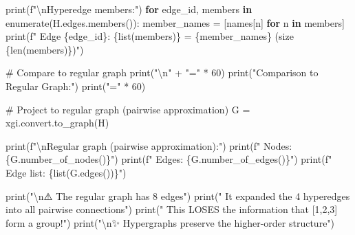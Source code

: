 \documentclass[
  11pt,
  letterpaper,
  oneside,
  openany]{book}
\newenvironment{Shaded}{\begin{snugshade}}{\end{snugshade}}
\newcommand{\BuiltInTok}[1]{\textcolor[rgb]{0.00,0.23,0.31}{#1}}
\newcommand{\CharTok}[1]{\textcolor[rgb]{0.13,0.47,0.30}{#1}}
\newcommand{\CommentTok}[1]{\textcolor[rgb]{0.37,0.37,0.37}{#1}}
\newcommand{\ControlFlowTok}[1]{\textcolor[rgb]{0.00,0.23,0.31}{\textbf{#1}}}
\newcommand{\DecValTok}[1]{\textcolor[rgb]{0.68,0.00,0.00}{#1}}
\newcommand{\KeywordTok}[1]{\textcolor[rgb]{0.00,0.23,0.31}{\textbf{#1}}}
\newcommand{\NormalTok}[1]{\textcolor[rgb]{0.00,0.23,0.31}{#1}}
\newcommand{\OperatorTok}[1]{\textcolor[rgb]{0.37,0.37,0.37}{#1}}
\newcommand{\SpecialCharTok}[1]{\textcolor[rgb]{0.37,0.37,0.37}{#1}}
\newcommand{\SpecialStringTok}[1]{\textcolor[rgb]{0.13,0.47,0.30}{#1}}
\newcommand{\StringTok}[1]{\textcolor[rgb]{0.13,0.47,0.30}{#1}}
\begin{document}
\begin{Shaded}
\begin{Highlighting}[]
\BuiltInTok{print}\NormalTok{(}\SpecialStringTok{f"}\CharTok{\textbackslash{}n}\SpecialStringTok{Hyperedge members:"}\NormalTok{)}
\ControlFlowTok{for}\NormalTok{ edge\_id, members }\KeywordTok{in} \BuiltInTok{enumerate}\NormalTok{(H.edges.members()):}
\NormalTok{    member\_names }\OperatorTok{=}\NormalTok{ [names[n] }\ControlFlowTok{for}\NormalTok{ n }\KeywordTok{in}\NormalTok{ members]}
    \BuiltInTok{print}\NormalTok{(}\SpecialStringTok{f"  Edge }\SpecialCharTok{\{}\NormalTok{edge\_id}\SpecialCharTok{\}}\SpecialStringTok{: }\SpecialCharTok{\{}\BuiltInTok{list}\NormalTok{(members)}\SpecialCharTok{\}}\SpecialStringTok{ = }\SpecialCharTok{\{}\NormalTok{member\_names}\SpecialCharTok{\}}\SpecialStringTok{ (size }\SpecialCharTok{\{}\BuiltInTok{len}\NormalTok{(members)}\SpecialCharTok{\}}\SpecialStringTok{)"}\NormalTok{)}

\CommentTok{\# Compare to regular graph}
\BuiltInTok{print}\NormalTok{(}\StringTok{"}\CharTok{\textbackslash{}n}\StringTok{"} \OperatorTok{+} \StringTok{"="} \OperatorTok{*} \DecValTok{60}\NormalTok{)}
\BuiltInTok{print}\NormalTok{(}\StringTok{"Comparison to Regular Graph:"}\NormalTok{)}
\BuiltInTok{print}\NormalTok{(}\StringTok{"="} \OperatorTok{*} \DecValTok{60}\NormalTok{)}

\CommentTok{\# Project to regular graph (pairwise approximation)}
\NormalTok{G }\OperatorTok{=}\NormalTok{ xgi.convert.to\_graph(H)}

\BuiltInTok{print}\NormalTok{(}\SpecialStringTok{f"}\CharTok{\textbackslash{}n}\SpecialStringTok{Regular graph (pairwise approximation):"}\NormalTok{)}
\BuiltInTok{print}\NormalTok{(}\SpecialStringTok{f"  Nodes: }\SpecialCharTok{\{}\NormalTok{G}\SpecialCharTok{.}\NormalTok{number\_of\_nodes()}\SpecialCharTok{\}}\SpecialStringTok{"}\NormalTok{)}
\BuiltInTok{print}\NormalTok{(}\SpecialStringTok{f"  Edges: }\SpecialCharTok{\{}\NormalTok{G}\SpecialCharTok{.}\NormalTok{number\_of\_edges()}\SpecialCharTok{\}}\SpecialStringTok{"}\NormalTok{)}
\BuiltInTok{print}\NormalTok{(}\SpecialStringTok{f"  Edge list: }\SpecialCharTok{\{}\BuiltInTok{list}\NormalTok{(G.edges())}\SpecialCharTok{\}}\SpecialStringTok{"}\NormalTok{)}

\BuiltInTok{print}\NormalTok{(}\StringTok{"}\CharTok{\textbackslash{}n}\StringTok{⚠️  The regular graph has 8 edges"}\NormalTok{)}
\BuiltInTok{print}\NormalTok{(}\StringTok{"   It \textquotesingle{}expanded\textquotesingle{} the 4 hyperedges into all pairwise connections"}\NormalTok{)}
\BuiltInTok{print}\NormalTok{(}\StringTok{"   This LOSES the information that [1,2,3] form a group!"}\NormalTok{)}
\BuiltInTok{print}\NormalTok{(}\StringTok{"}\CharTok{\textbackslash{}n}\StringTok{✨ Hypergraphs preserve the higher{-}order structure"}\NormalTok{)}
\end{Highlighting}
\end{Shaded}
\end{document}

